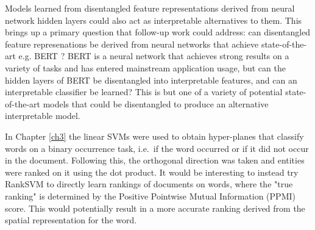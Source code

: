 
Models learned from disentangled feature representations derived from neural network hidden layers could also act as interpretable alternatives to them. This brings up a primary question that follow-up work could address: can disentangled feature represenations be derived from neural networks that achieve state-of-the-art e.g. BERT \cite{Kenton1953}? BERT is a neural network that achieves strong results on a variety of tasks and has entered mainstream application usage,  but can the hidden layers of BERT be disentangled into interpretable features, and can an interpretable classifier be learned? This is but one of a variety of potential  state-of-the-art models that could be disentangled  to produce an alternative interpretable model.


In Chapter \ref{ch3} the linear SVMs were used to obtain hyper-planes that classify words on a binary occurrence task, i.e.\ if the word occurred or if it did not occur in the document. Following this, the orthogonal direction was taken and entities were ranked on it using the dot product. It would be interesting to instead try RankSVM \cite{Lee2012} to directly learn rankings of documents on words, where the "true ranking" is determined by the Positive Pointwise Mutual Information (PPMI) score. This would potentially result in a more accurate ranking derived from the spatial representation for the word.



